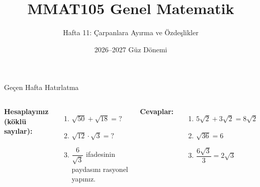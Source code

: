 \documentclass[aspectratio=169,11pt,handout]{beamer}
\title[MMAT105 -- Hafta 11]{MMAT105 Genel Matematik}
\subtitle{Hafta 11: Çarpanlara Ayırma ve Özdeşlikler}
\author{}
\date{2026--2027 Güz Dönemi}
\begin{document}
\begin{frame}
\titlepage
\end{frame}


\begin{frame}{Geçen Hafta Hatırlatma}
\begin{columns}[t]
\textbf{Hesaplayınız (köklü sayılar):}
\begin{enumerate}
\item \(\sqrt{50}+\sqrt{18}=?\)
\item \(\sqrt{12}\cdot\sqrt{3}=?\)
\item \(\dfrac{6}{\sqrt{3}}\) ifadesinin paydasını rasyonel yapınız.
\end{enumerate}
\pause
\textbf{Cevaplar:}
\begin{enumerate}
\item \(5\sqrt{2}+3\sqrt{2}=8\sqrt{2}\)
\item \(\sqrt{36}=6\)
\item \(\dfrac{6\sqrt{3}}{3}=2\sqrt{3}\)
\end{enumerate}
\end{columns}
\end{frame}
\end{document}
